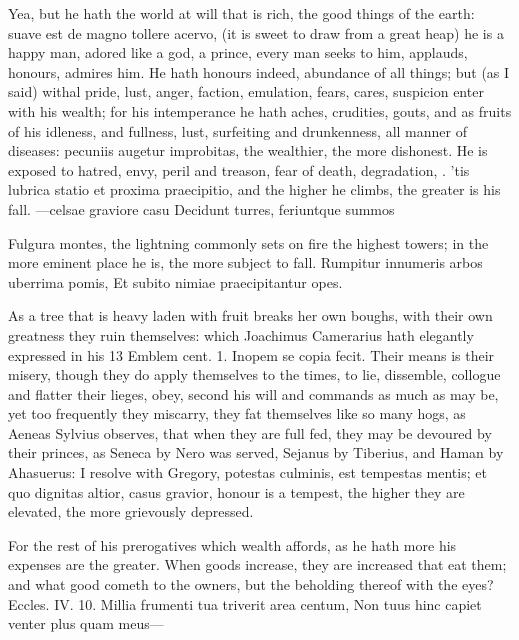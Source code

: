 {Yea, but he hath the world at will that is rich, the good things of the
earth: suave est de magno tollere acervo, (it is sweet to draw from a
great heap) he is a happy man, adored like a god, a prince, every
man seeks to him, applauds, honours, admires him. He hath honours
indeed, abundance of all things; but (as I said) withal pride,
lust, anger, faction, emulation, fears, cares, suspicion enter with his
wealth; for his intemperance he hath aches, crudities, gouts, and as
fruits of his idleness, and fullness, lust, surfeiting and drunkenness,
all manner of diseases: pecuniis augetur improbitas, the wealthier, the
more dishonest. He is exposed to hatred, envy, peril and treason,
fear of death, degradation, \etc{}. 'tis lubrica statio et proxima
praecipitio, and the higher he climbs, the greater is his fall.
---celsae graviore casu
Decidunt turres, feriuntque summos

Fulgura montes, the lightning commonly sets on fire the highest towers;
in the more eminent place he is, the more subject to fall.
Rumpitur innumeris arbos uberrima pomis,
Et subito nimiae praecipitantur opes.

As a tree that is heavy laden with fruit breaks her own boughs, with
their own greatness they ruin themselves: which Joachimus Camerarius
hath elegantly expressed in his 13 Emblem cent. 1. Inopem se copia
fecit. Their means is their misery, though they do apply themselves to
the times, to lie, dissemble, collogue and flatter their lieges, obey,
second his will and commands as much as may be, yet too frequently they
miscarry, they fat themselves like so many hogs, as Aeneas
Sylvius observes, that when they are full fed, they may be devoured by
their princes, as Seneca by Nero was served, Sejanus by Tiberius, and
Haman by Ahasuerus: I resolve with Gregory, potestas culminis, est
tempestas mentis; et quo dignitas altior, casus gravior, honour is a
tempest, the higher they are elevated, the more grievously depressed.

For the rest of his prerogatives which wealth affords, as he hath more
his expenses are the greater. When goods increase, they are increased
that eat them; and what good cometh to the owners, but the beholding
thereof with the eyes? Eccles. IV. 10.
Millia frumenti tua triverit area centum,
Non tuus hinc capiet venter plus quam meus---

}
